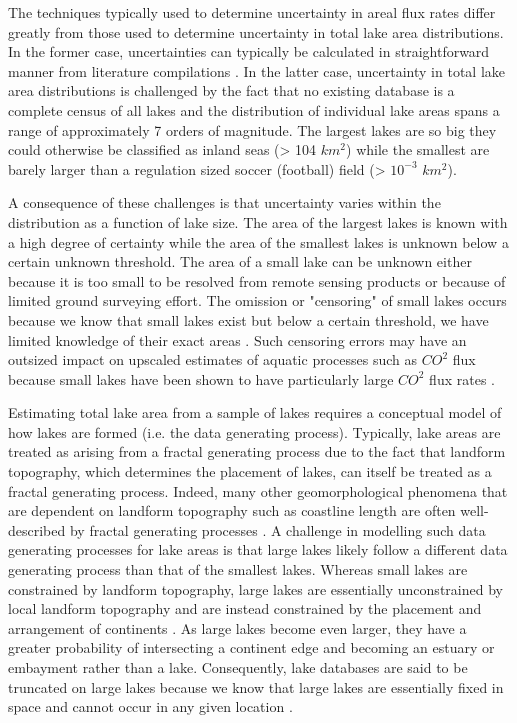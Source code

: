 \documentclass{article}
\begin{document}
The techniques typically used to determine uncertainty in areal flux rates differ greatly from those used to determine uncertainty in total lake area distributions. In the former case, uncertainties can typically be calculated in straightforward manner from literature compilations \citep{delsontroGreenhouseGasEmissions2018, kellerGlobalCarbonBudget2021}. In the latter case, uncertainty in total lake area distributions is challenged by the fact that no existing database is a complete census of all lakes \citep{messagerEstimatingVolumeAge2016} and the distribution of individual lake areas spans a range of approximately 7 orders of magnitude. The largest lakes are so big they could otherwise be classified as inland seas (> 104 $km^2$) while the smallest are barely larger than a regulation sized soccer (football) field (> $10^{-3}$ $km^2$).

A consequence of these challenges is that uncertainty varies within the distribution as a function of lake size. The area of the largest lakes is known with a high degree of certainty while the area of the smallest lakes is unknown below a certain unknown threshold. The area of a small lake can be unknown either because it is too small to be resolved from remote sensing products or because of limited ground surveying effort. The omission or "censoring" of small lakes occurs because we know that small lakes exist but below a certain threshold, we have limited knowledge of their exact areas \citep{hamiltonEstimationFractalDimension1992}. Such censoring errors may have an outsized impact on upscaled estimates of aquatic processes such as $CO^2$ flux because small lakes have been shown to have particularly large $CO^2$ flux rates \citep{delsontroGreenhouseGasEmissions2018,piMappingGlobalLake2022}.

Estimating total lake area from a sample of lakes requires a conceptual model of how lakes are formed (i.e. the data generating process). Typically, lake areas are treated as arising from a fractal generating process due to the fact that landform topography, which determines the placement of lakes, can itself be treated as a fractal generating process. Indeed, many other geomorphological phenomena that are dependent on landform topography such as coastline length are often well-described by fractal generating processes \citep{newman_power_2005}. A challenge in modelling such data generating processes for lake areas is that large lakes likely follow a different data generating process than that of the smallest lakes. Whereas small lakes are constrained by landform topography, large lakes are essentially unconstrained by local landform topography and are instead constrained by the placement and arrangement of continents \citep{goodchildLakesFractalSurfaces1988}. As large lakes become even larger, they have a greater probability of intersecting a continent edge and becoming an estuary or embayment rather than a lake. Consequently, lake databases are said to be truncated on large lakes because we know that large lakes are essentially fixed in space and cannot occur in any given location \citep{hamiltonEstimationFractalDimension1992}.
\end{document}
